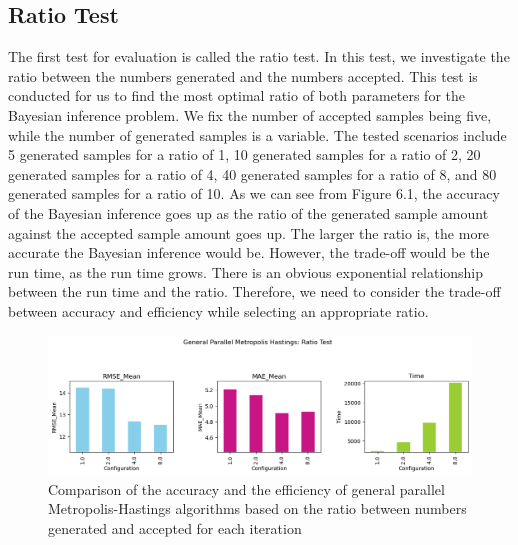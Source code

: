 \subsection{Ratio Test}
The first test for evaluation is called the ratio test. In this test, we investigate the ratio between the numbers generated and the numbers accepted. This test is conducted for us to find the most optimal ratio of both parameters for the Bayesian inference problem. We fix the number of accepted samples being five, while the number of generated samples is a variable. The tested scenarios include 5 generated samples for a ratio of 1, 10 generated samples for a ratio of 2, 20 generated samples for a ratio of 4, 40 generated samples for a ratio of 8, and 80 generated samples for a ratio of 10. As we can see from Figure 6.1, the accuracy of the Bayesian inference goes up as the ratio of the generated sample amount against the accepted sample amount goes up. The larger the ratio is, the more accurate the Bayesian inference would be. However, the trade-off would be the run time, as the run time grows. There is an obvious exponential relationship between the run time and the ratio. Therefore, we need to consider the trade-off between accuracy and efficiency while selecting an appropriate ratio.

\begin{figure}[H]
    \centering
    \includegraphics[width=1\textwidth]{figures/gpmh/ratio_test.png}
    \captionsetup{width=.8\textwidth}
    \caption{Comparison of the accuracy and the efficiency of general parallel Metropolis-Hastings algorithms based on the ratio between numbers generated and accepted for each iteration}
    \label{fig:enter-label}
\end{figure}

